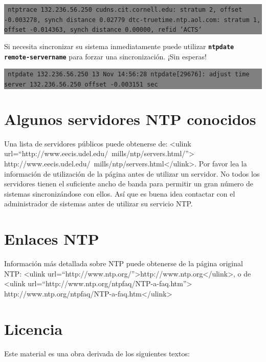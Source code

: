 \documentclass[12pt]{article}
\begin{document}
\colorbox{grey}{\parbox[t]{0.95\linewidth}{ \vspace*{0.5cm} {\tt 
ntptrace 132.236.56.250
cudns.cit.cornell.edu: stratum 2, offset -0.003278, synch distance 0.02779
dtc-truetime.ntp.aol.com: stratum 1, offset -0.014363, synch distance 0.00000, refid 'ACTS' 
} \vspace*{0.5cm} } } 

	

	
	
Si necesita sincronizar su sistema inmediatamente puede utilizar
\texttt{\textbf{ntpdate remote-servername}} para forzar una sincronización. ¡Sin esperas!


\colorbox{grey}{\parbox[t]{0.95\linewidth}{ \vspace*{0.5cm} {\tt
ntpdate 132.236.56.250
13 Nov 14:56:28 ntpdate[29676]: adjust time server 132.236.56.250 offset -0.003151 sec
  } \vspace*{0.5cm} } } 


\section*{ Algunos servidores NTP conocidos}


Una lista de servidores públicos puede obtenerse de:
<ulink url=``http://www.eecis.udel.edu/~mills/ntp/servers.html/''>
	http://www.eecis.udel.edu/~mills/ntp/servers.html</ulink>. Por favor lea la
información de utilización de la página antes de utilizar un servidor. No 
todos los servidores tienen el suficiente ancho de banda para permitir 
un gran número de sistemas sincronizándose con ellos. Así que es buena 
idea contactar con el administrador de sistemas antes de utilizar su 
servicio NTP.



\section*{ Enlaces NTP}


Información más detallada sobre NTP puede obtenerse de la página
original NTP: <ulink url=``http://www.ntp.org/''>http://www.ntp.org</ulink>, o de
<ulink url=``http://www.ntp.org/ntpfaq/NTP-a-faq.htm''>
	http://www.ntp.org/ntpfaq/NTP-a-faq.htm</ulink>


\section*{Licencia}

Este material es una obra derivada de los siguientes textos:
\end{document}
